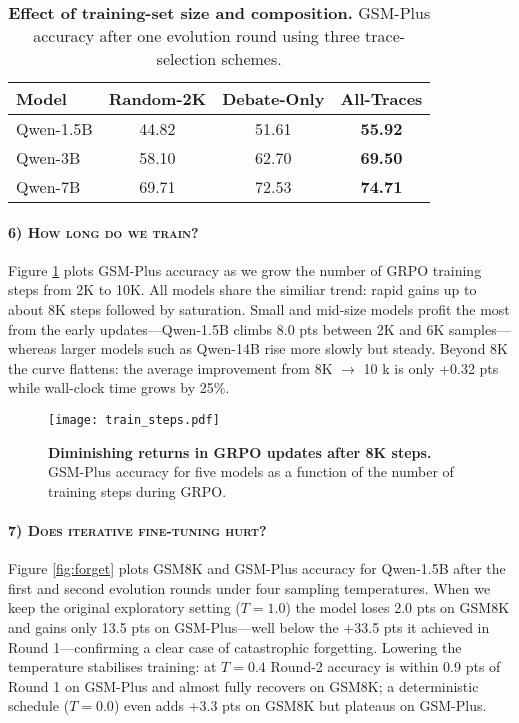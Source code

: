 \documentclass[11pt]{article}
\begin{document}
\begin{table}[t]
\centering
\small
\begin{tabular}{@{}lccc@{}}
\toprule
\textbf{Model} & \textbf{Random-2K} & \textbf{Debate-Only} & \textbf{All-Traces} \\
\midrule
Qwen-1.5B & 44.82 & 51.61 & \textbf{55.92} \\
Qwen-3B   & 58.10 & 62.70 & \textbf{69.50} \\
Qwen-7B   & 69.71 & 72.53 & \textbf{74.71} \\
\bottomrule
\end{tabular}
\caption{\textbf{Effect of training-set size and composition.} GSM-Plus accuracy after one evolution round using three trace-selection schemes.}
\label{tab:data_selection}
\end{table}

\paragraph{\textsc{6) How long do we train?}} Figure \ref{fig:steps} plots GSM-Plus accuracy as we grow the number of GRPO training steps from 2K to 10K. All models share the similiar trend: rapid gains up to about 8K steps followed by saturation. Small and mid-size models profit the most from the early updates—Qwen-1.5B climbs 8.0 pts between 2K and 6K samples—whereas larger models such as Qwen-14B rise more slowly but steady. Beyond 8K the curve flattens: the average improvement from 8K $→$ 10 k is only +0.32 pts while wall-clock time grows by 25\%.  

\begin{figure}[t]
    \centering
    \texttt{[image: train\_steps.pdf]}
    \caption{\textbf{Diminishing returns in GRPO updates after 8K steps.}  
    GSM-Plus accuracy for five models as a function of the number of training steps during GRPO.}

    \label{fig:steps}
\end{figure}





\paragraph{\textsc{7) Does iterative fine-tuning hurt?}} Figure \ref{fig:forget} plots GSM8K and GSM-Plus accuracy for Qwen-1.5B after the first and second evolution rounds under four sampling temperatures. When we keep the original exploratory setting (\(T=1.0\)) the model loses 2.0 pts on GSM8K and gains only 13.5 pts on GSM-Plus—well below the +33.5 pts it achieved in Round 1—confirming a clear case of catastrophic forgetting. Lowering the temperature stabilises training: at \(T=0.4\) Round-2 accuracy is within 0.9 pts of Round 1 on GSM-Plus and almost fully recovers on GSM8K; a deterministic schedule (\(T=0.0\)) even adds +3.3 pts on GSM8K but plateaus on GSM-Plus.
\end{document}
